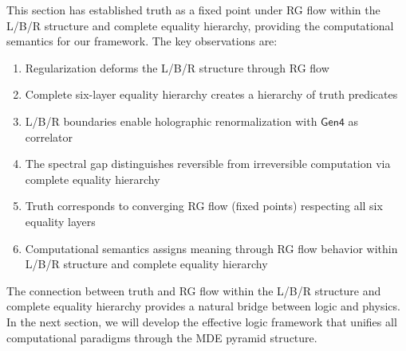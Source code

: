This section has established truth as a fixed point under RG flow within the L/B/R structure and complete equality hierarchy, providing the computational semantics for our framework. The key observations are:

\begin{enumerate}
\item Regularization deforms the L/B/R structure through RG flow
\item Complete six-layer equality hierarchy creates a hierarchy of truth predicates
\item L/B/R boundaries enable holographic renormalization with $\mathsf{Gen4}$ as correlator
\item The spectral gap distinguishes reversible from irreversible computation via complete equality hierarchy
\item Truth corresponds to converging RG flow (fixed points) respecting all six equality layers
\item Computational semantics assigns meaning through RG flow behavior within L/B/R structure and complete equality hierarchy
\end{enumerate}

The connection between truth and RG flow within the L/B/R structure and complete equality hierarchy provides a natural bridge between logic and physics. In the next section, we will develop the effective logic framework that unifies all computational paradigms through the MDE pyramid structure.
